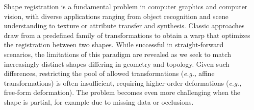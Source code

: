 \documentclass[acmtog,timestamp]{acmart}%
\begin{document}
Shape registration is a fundamental problem in computer graphics and computer vision, with diverse applications ranging from object recognition and scene understanding to texture or attribute transfer and synthesis. Classic approaches draw from a predefined family of transformations to obtain a warp that optimizes the registration between two shapes. While successful in straight-forward scenarios, the limitations of this paradigm are revealed as we seek to match increasingly distinct shapes differing in geometry and topology. Given such differences, restricting the pool of allowed transformations (\emph{e.g.,} affine transformations) is often insufficient, requiring higher-order deformations (\emph{e.g.,} free-form deformation). The problem becomes even more challenging when the shape is partial, for example due to missing data or occlusions.
\end{document}
